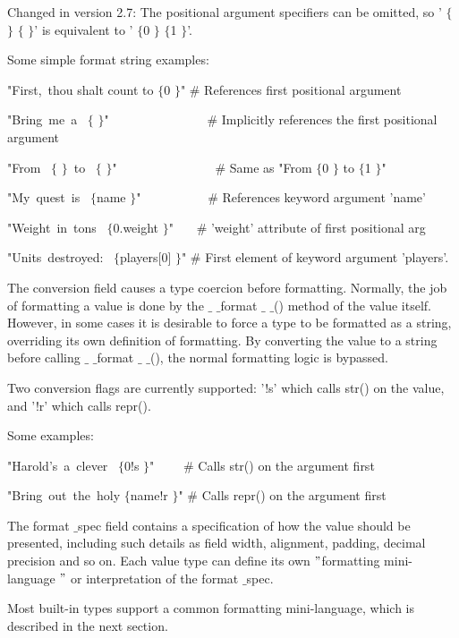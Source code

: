 Changed in version 2.7: The positional argument specifiers can be omitted, so ' $  \{  $ $  \}  $  $  \{  $ $  \}  $' is equivalent to ' $  \{  $0 $  \}  $  $  \{  $1 $  \}  $'. \par
Some simple format string examples: \par
"First,~thou shalt count to  $  \{  $0 $  \}  $"   $  \#  $ References first positional argument \par
"Bring~me~a~ $  \{  $ $  \}  $"~~~~~~~~~~~~~~~     $  \#  $ Implicitly references the first positional argument \par
"From~ $  \{  $ $  \}  $~to~ $  \{  $ $  \}  $"~~~~~~~~~~~~~~~     $  \#  $ Same as "From  $  \{  $0 $  \}  $ to  $  \{  $1 $  \}  $" \par
"My~quest~is~ $  \{  $name $  \}  $"~~~~~~~~~~     $  \#  $ References keyword argument 'name' \par
"Weight~in~tons~ $  \{  $0.weight $  \}  $"~~~     $  \#  $ 'weight' attribute of first positional arg \par
"Units~destroyed:~ $  \{  $players[0] $  \}  $"    $  \#  $ First element of keyword argument 'players'. \par
The conversion field causes a type coercion before formatting. Normally, the job of formatting a value is done by the  $  \_  $ $  \_  $format $  \_  $ $  \_  $() method of the value itself. However, in some cases it is desirable to force a type to be formatted as a string, overriding its own definition of formatting. By converting the value to a string before calling  $  \_  $ $  \_  $format $  \_  $ $  \_  $(), the normal formatting logic is bypassed. \par
Two conversion flags are currently supported: '!s' which calls str() on the value, and '!r' which calls repr(). \par
Some examples: \par
"Harold's~a~clever~ $  \{  $0!s $  \}  $"~~~~     $  \#  $ Calls str() on the argument first \par
"Bring~out~the~holy  $  \{  $name!r $  \}  $"     $  \#  $ Calls repr() on the argument first \par
The format $  \_  $spec field contains a specification of how the value should be presented, including such details as field width, alignment, padding, decimal precision and so on. Each value type can define its own  $ " $formatting mini-language $ " $ or interpretation of the format $  \_  $spec. \par
Most built-in types support a common formatting mini-language, which is described in the next section. \par

